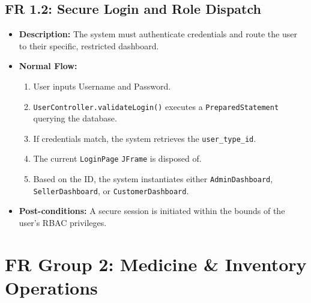 \documentclass[12pt,a4paper]{report}
\begin{document}
\subsection{FR 1.2: Secure Login and Role Dispatch}
\begin{itemize}
    \item \textbf{Description:} The system must authenticate credentials and route the user to their specific, restricted dashboard.
    \item \textbf{Normal Flow:}
        \begin{enumerate}
            \item User inputs Username and Password.
            \item \texttt{UserController.validateLogin()} executes a \texttt{PreparedStatement} querying the database.
            \item If credentials match, the system retrieves the \texttt{user\_type\_id}.
            \item The current \texttt{LoginPage} \texttt{JFrame} is disposed of.
            \item Based on the ID, the system instantiates either \texttt{AdminDashboard}, \texttt{SellerDashboard}, or \texttt{CustomerDashboard}.
        \end{enumerate}
    \item \textbf{Post-conditions:} A secure session is initiated within the bounds of the user's RBAC privileges.
\end{itemize}

\section{FR Group 2: Medicine \& Inventory Operations}
\end{document}
